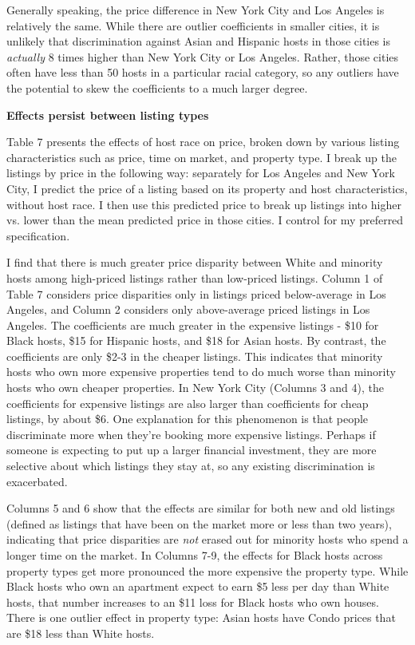 \documentclass[11pt, oneside]{article}
\begin{document}
Generally speaking, the price difference in New York City and Los Angeles is relatively the same. While there are outlier coefficients in smaller cities, it is unlikely that discrimination against Asian and Hispanic hosts in those cities is \textit{actually} 8 times higher than New York City or Los Angeles. Rather, those cities often have less than 50 hosts in a particular racial category, so any outliers have the potential to skew the coefficients to a much larger degree.  

\textbf{Effects persist between listing types}

Table 7 presents the effects of host race on price, broken down by various listing characteristics such as price, time on market, and property type. I break up the listings by price in the following way: separately for Los Angeles and New York City, I predict the price of a listing based on its property and host characteristics, without host race. I then use this predicted price to break up listings into higher vs. lower than the mean predicted price in those cities. I control for my preferred specification.  

I find that there is much greater price disparity between White and minority hosts among high-priced listings rather than low-priced listings. Column 1 of Table 7 considers price disparities only in listings priced below-average in Los Angeles, and Column 2 considers only above-average priced listings in Los Angeles. The coefficients are much greater in the expensive listings - \$10 for Black hosts, \$15 for Hispanic hosts, and \$18 for Asian hosts. By contrast, the coefficients are only \$2-3 in the cheaper listings. This indicates that minority hosts who own more expensive properties tend to do much worse than minority hosts who own cheaper properties. In New York City (Columns 3 and 4), the coefficients for expensive listings are also larger than coefficients for cheap listings, by about \$6. One explanation for this phenomenon is that people discriminate more when they're booking more expensive listings. Perhaps if someone is expecting to put up a larger financial investment, they are more selective about which listings they stay at, so any existing discrimination is exacerbated. 

Columns 5 and 6 show that the effects are similar for both new and old listings (defined as listings that have been on the market more or less than two years), indicating that price disparities are \textit{not} erased out for minority hosts who spend a longer time on the market. In Columns 7-9, the effects for Black hosts across property types get more pronounced the more expensive the property type. While Black hosts who own an apartment expect to earn \$5 less per day than White hosts, that number increases to an \$11 loss for Black hosts who own houses. There is one outlier effect in property type: Asian hosts have Condo prices that are \$18 less than White hosts. 
\end{document}
